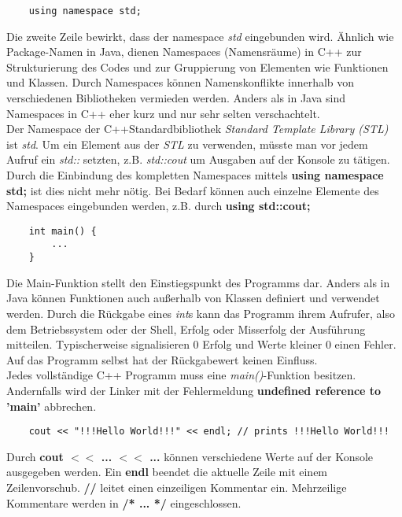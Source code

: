 \documentclass[
  accentcolor=tud1c,	%
  colorbacktitle,		%
  inverttitle,			%
  german,				%
  twoside
]{tudexercise}
\begin{document}
\begin{lstlisting}
	using namespace std;
\end{lstlisting}
Die zweite Zeile bewirkt, dass der namespace \emph{std} eingebunden wird. Ähnlich wie Package-Namen in Java, dienen Namespaces (Namensräume) in C++ zur Strukturierung des Codes und zur Gruppierung von Elementen wie Funktionen und Klassen. Durch Namespaces können Namenskonflikte innerhalb von verschiedenen Bibliotheken vermieden werden. Anders als in Java sind Namespaces in C++ eher kurz und nur sehr selten verschachtelt.\\

Der Namespace der C++Standardbibliothek \emph{Standard Template Library (STL)} ist \emph{std}. Um ein Element aus der  
\emph{STL} zu verwenden, müsste man vor jedem Aufruf ein \emph{std::} setzten, z.B. \emph{std::cout} um Ausgaben auf der Konsole zu tätigen. Durch die Einbindung des kompletten Namespaces mittels \textbf{using namespace std;} ist dies nicht mehr nötig. Bei Bedarf können auch einzelne Elemente des Namespaces eingebunden werden, z.B. durch \textbf{using std::cout;} 

\begin{lstlisting}
	int main() {
		...
	}
\end{lstlisting}

Die Main-Funktion stellt den Einstiegspunkt des Programms dar. Anders als in Java können Funktionen auch außerhalb von Klassen definiert und verwendet werden. Durch die Rückgabe eines \emph{int}s kann das Programm ihrem Aufrufer, also dem Betriebssystem oder der Shell, Erfolg oder Misserfolg der Ausführung mitteilen. Typischerweise signalisieren 0 Erfolg und Werte kleiner 0 einen Fehler. Auf das Programm selbst hat der Rückgabewert keinen Einfluss. \\

Jedes vollständige C++ Programm muss eine \emph{main()}-Funktion besitzen. Andernfalls wird der Linker mit der Fehlermeldung \textbf{undefined reference to 'main'} abbrechen.\\

\begin{lstlisting}
	cout << "!!!Hello World!!!" << endl; // prints !!!Hello World!!!
\end{lstlisting}
Durch \textbf{cout $<<$ ... $<<$ ...} können verschiedene Werte auf der Konsole ausgegeben werden. Ein \textbf{endl} beendet die aktuelle Zeile mit einem Zeilenvorschub. \textbf{//} leitet einen einzeiligen Kommentar ein. Mehrzeilige Kommentare werden in \textbf{/* ... */} eingeschlossen.
\end{document}
